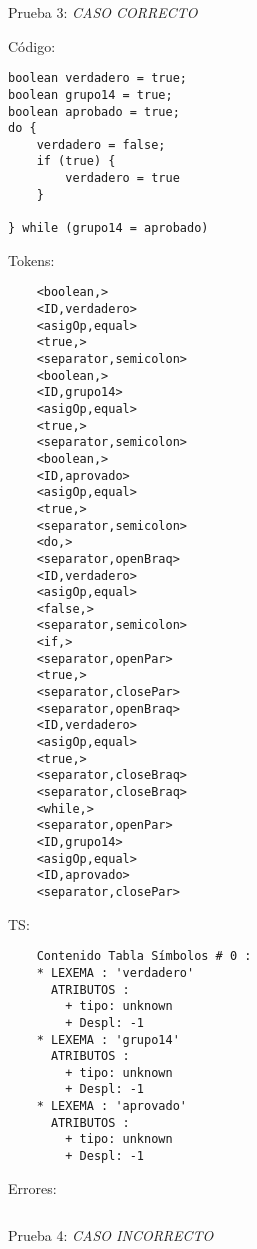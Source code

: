 \documentclass{article}
\begin{document}
Prueba 3: \textit{CASO CORRECTO}%
\begin{flushleft}
Código:
\begin{verbatim}
boolean verdadero = true;
boolean grupo14 = true;
boolean aprobado = true;
do {
    verdadero = false;
    if (true) {
        verdadero = true
    }

} while (grupo14 = aprobado)
\end{verbatim}

Tokens:
\begin{verbatim}
    <boolean,>
    <ID,verdadero>
    <asigOp,equal>
    <true,>
    <separator,semicolon>
    <boolean,>
    <ID,grupo14>
    <asigOp,equal>
    <true,>
    <separator,semicolon>
    <boolean,>
    <ID,aprovado>
    <asigOp,equal>
    <true,>
    <separator,semicolon>
    <do,>
    <separator,openBraq>
    <ID,verdadero>
    <asigOp,equal>
    <false,>
    <separator,semicolon>
    <if,>
    <separator,openPar>
    <true,>
    <separator,closePar>
    <separator,openBraq>
    <ID,verdadero>
    <asigOp,equal>
    <true,>
    <separator,closeBraq>
    <separator,closeBraq>
    <while,>
    <separator,openPar>
    <ID,grupo14>
    <asigOp,equal>
    <ID,aprovado>
    <separator,closePar>    
\end{verbatim}
    TS:
\begin{verbatim}
    Contenido Tabla Símbolos # 0 :
    * LEXEMA : 'verdadero'
      ATRIBUTOS :
        + tipo: unknown
        + Despl: -1
    * LEXEMA : 'grupo14'
      ATRIBUTOS :
        + tipo: unknown
        + Despl: -1
    * LEXEMA : 'aprovado'
      ATRIBUTOS :
        + tipo: unknown
        + Despl: -1
\end{verbatim}
Errores:
\begin{verbatim}

\end{verbatim}
\end{flushleft}
Prueba 4: \textit{CASO INCORRECTO}%
\end{document}
